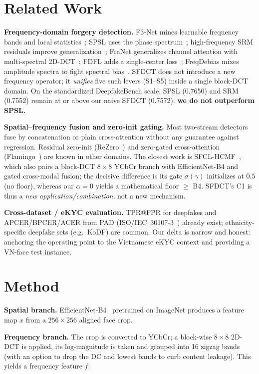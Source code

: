 \documentclass[conference]{IEEEtran}
\begin{document}
\section{Related Work}
\textbf{Frequency-domain forgery detection.} F3-Net mines learnable frequency bands and local
statistics~\cite{qian2020f3net}; SPSL uses the phase spectrum~\cite{liu2021spsl}; high-frequency
SRM residuals improve generalization~\cite{luo2021srm}; FcaNet generalizes channel attention with
multi-spectral 2D-DCT~\cite{qin2021fcanet}; FDFL adds a single-center loss~\cite{li2021fdfl};
FreqDebias mixes amplitude spectra to fight spectral bias~\cite{freqdebias2025}. SFDCT does not
introduce a new frequency operator; it \emph{unifies} five such levers (S1--S5) inside a single
block-DCT domain. On the standardized DeepfakeBench scale, SPSL (0.7650) and SRM (0.7552) remain
at or above our naive SFDCT (0.7572): \textbf{we do not outperform SPSL.}

\textbf{Spatial--frequency fusion and zero-init gating.} Most two-stream detectors fuse by
concatenation or plain cross-attention without any guarantee against regression. Residual zero-init
(ReZero~\cite{bachlechner2021rezero}) and zero-gated cross-attention (Flamingo~\cite{alayrac2022flamingo})
are known in other domains. The closest work is SFCL-HCMF~\cite{sfclhcmf2025}, which also pairs a
block-DCT $8{\times}8$ YCbCr branch with EfficientNet-B4 and gated cross-modal fusion; the decisive
difference is its gate $\sigma(\gamma)$ initializes at $0.5$ (no floor), whereas our $\alpha{=}0$ yields a
mathematical floor $\ge$ B4. SFDCT's C1 is thus a \emph{new application/combination}, not a new mechanism.

\textbf{Cross-dataset / eKYC evaluation.} TPR@FPR for deepfakes and APCER/BPCER/ACER from PAD
(ISO/IEC~30107-3~\cite{iso30107}) already exist; ethnicity-specific deepfake sets (e.g.\ KoDF) are
common. Our delta is narrow and honest: anchoring the operating point to the Vietnamese eKYC context
and providing a VN-face test instance.

\section{Method}\label{sec:method}
\textbf{Spatial branch.} EfficientNet-B4~\cite{tan2019efficientnet} pretrained on ImageNet produces a
feature map $x$ from a $256{\times}256$ aligned face crop.

\textbf{Frequency branch.} The crop is converted to YCbCr; a block-wise $8{\times}8$ 2D-DCT is applied,
its log-magnitude is taken and grouped into 16 zigzag bands (with an option to drop the DC and lowest
bands to curb content leakage). This yields a frequency feature $f$.
\end{document}
